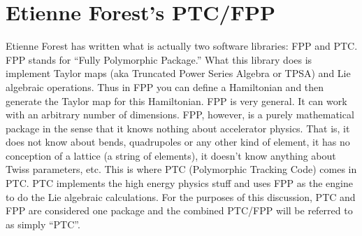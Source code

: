 \chapter{Etienne Forest's PTC/FPP}
\label{c:ptc}

Etienne Forest\cite{b:forest} has written what is actually two
software libraries: FPP and PTC.  FPP stands for ``Fully Polymorphic
Package.'' What this library does is implement Taylor maps (aka
Truncated Power Series Algebra or TPSA) and Lie algebraic
operations. Thus in FPP you can define a Hamiltonian and then generate
the Taylor map for this Hamiltonian. FPP is very general. It can work
with an arbitrary number of dimensions.  FPP, however, is a purely
mathematical package in the sense that it knows nothing about
accelerator physics. That is, it does not know about bends,
quadrupoles or any other kind of element, it has no conception of a
lattice (a string of elements), it doesn't know anything about Twiss
parameters, etc. This is where PTC (Polymorphic Tracking Code) comes
in PTC. PTC implements the high energy physics stuff and uses FPP as
the engine to do the Lie algebraic calculations.  For the purposes of
this discussion, PTC and FPP are considered one package and the
combined PTC/FPP will be referred to as simply ``PTC''.


